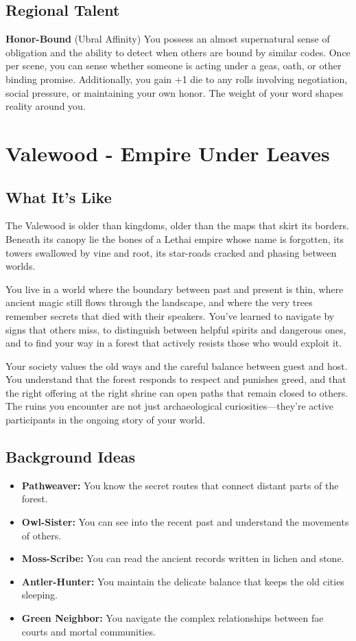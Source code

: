 \documentclass[11pt]{article}
\newcommand{\region}[1]{\section*{#1}}
\newcommand{\subregion}[1]{\subsection*{#1}}
\begin{document}
\begin{multicols}{2}
\subregion{Regional Talent}

\textbf{Honor-Bound} (Ubral Affinity)
You possess an almost supernatural sense of obligation and the ability to detect when others are bound by similar codes. Once per scene, you can sense whether someone is acting under a geas, oath, or other binding promise. Additionally, you gain +1 die to any rolls involving negotiation, social pressure, or maintaining your own honor. The weight of your word shapes reality around you.

\end{multicols}

\region{Valewood - Empire Under Leaves}

\begin{multicols}{2}
\subregion{What It's Like}

The Valewood is older than kingdoms, older than the maps that skirt its borders. Beneath its canopy lie the bones of a Lethai empire whose name is forgotten, its towers swallowed by vine and root, its star-roads cracked and phasing between worlds.

You live in a world where the boundary between past and present is thin, where ancient magic still flows through the landscape, and where the very trees remember secrets that died with their speakers. You've learned to navigate by signs that others miss, to distinguish between helpful spirits and dangerous ones, and to find your way in a forest that actively resists those who would exploit it.

Your society values the old ways and the careful balance between guest and host. You understand that the forest responds to respect and punishes greed, and that the right offering at the right shrine can open paths that remain closed to others. The ruins you encounter are not just archaeological curiosities—they're active participants in the ongoing story of your world.

\columnbreak

\subregion{Background Ideas}

\begin{itemize}[leftmargin=*]
    \item \textbf{Pathweaver:} You know the secret routes that connect distant parts of the forest.
    \item \textbf{Owl-Sister:} You can see into the recent past and understand the movements of others.
    \item \textbf{Moss-Scribe:} You can read the ancient records written in lichen and stone.
    \item \textbf{Antler-Hunter:} You maintain the delicate balance that keeps the old cities sleeping.
    \item \textbf{Green Neighbor:} You navigate the complex relationships between fae courts and mortal communities.
\end{itemize}


\end{multicols}
\end{document}
